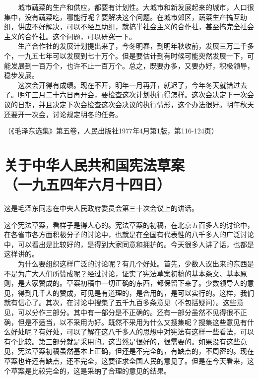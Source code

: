 \documentclass[cn,11pt,chinese]{elegantbook}
\def\myformat#1{\hfil\hfil #1}
\begin{document}
　　城市蔬菜的生产和供应，都要有计划性。大城市和新发展起来的城市，人口很集中，没有蔬菜吃，哪能行呢？要解决这个问题。在城市郊区，蔬菜生产搞互助组，供应不好解决，可以不经互助组，就搞半社会主义的合作社，甚至搞完全社会主义的合作社。这个问题，可以研究一下。\\
　　生产合作社的发展计划提出来了，今冬明春，到明年秋收前，发展三万二千多个，一九五七年可以发展到七十万个。但是要估计到有时候可能突然发展一下，可能发展到一百万个，也许不止一百万个。总之，既要办多，又要办好，积极领导，稳步发展。\\
　　这次会开得有成绩。现在不开，明年一月再开，就迟了，今年冬天就错过去了。明年三月二十六日再开会，要检查这次计划执行得怎样。这次会决定下一次会议的日期，并且决定下次会检查这次会决议的执行情形，这个办法很好。明年秋天还要开一次会，讨论规定明冬的任务。\\
\begin{flushright}（《毛泽东选集》第五卷，人民出版社1977年4月第1版，第116-124页）\end{flushright}
\newpage\section*{\myformat{关于中华人民共和国宪法草案}\\\myformat{（一九五四年六月十四日）}}
\begin{introduction}\item  这是毛泽东同志在中央人民政府委员会第三十次会议上的讲话。\end{introduction}
这个宪法草案，看样子是得人心的。宪法草案的初稿，在北京五百多人的讨论中，在各省市各方面积极分子的讨论中，也就是在全国有代表性的八千多人的广泛讨论中，可以看出是比较好的，是得到大家同意和拥护的。今天很多人讲了话，也都是这样讲的。\\
　　为什么要组织这样广泛的讨论呢？有几个好处。首先，少数人议出来的东西是不是为广大人们所赞成呢？经过讨论，证实了宪法草案初稿的基本条文、基本原则，是大家赞成的。草案初稿中一切正确的东西，都保留下来了。少数领导人的意见，得到几千人的赞成，可见是有道理的，是合用的，是可以实行的。这样，我们就有信心了。其次，在讨论中搜集了五千九百多条意见（不包括疑问）。这些意见，可以分作三部分。其中有一部分是不正确的。还有一部分虽然不见得很不正确，但是不适当，以不采用为好。既然不采用为什么又搜集呢？搜集这些意见有什么好处呢？有好处，可以了解在这八千多人的思想中对宪法有这样一些看法，可以有个比较。第三部分就是采用的。这当然是很好的，很需要的。如果没有这些意见，宪法草案初稿虽然基本上正确，但还是不完全的，有缺点的，不周密的。现在草案也许还有缺点，还不完全，这要征求全国人民的意见了。但是在今天看来，这个草案是比较完全的，这是采纳了合理的意见的结果。\\
\end{document}
